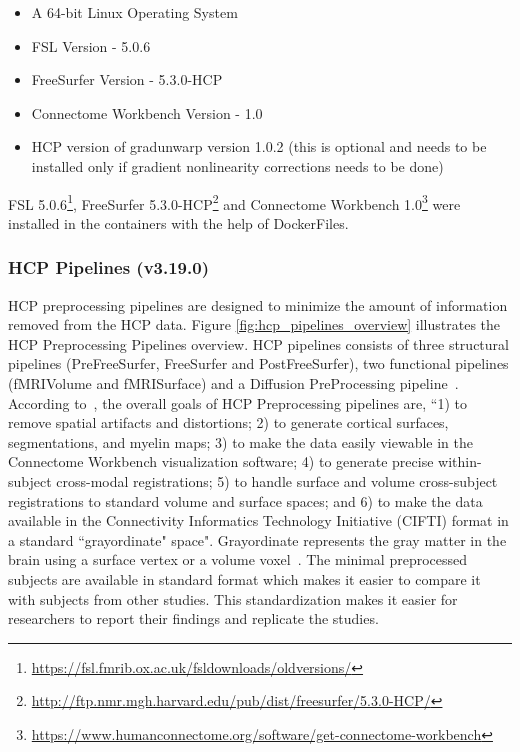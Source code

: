 \begin{itemize}
 \item A 64-bit Linux Operating System
 \item FSL Version - 5.0.6
 \item FreeSurfer Version - 5.3.0-HCP
 \item Connectome Workbench Version - 1.0
 \item HCP version of gradunwarp version 1.0.2 (this is optional and needs to be installed only if gradient nonlinearity corrections needs to be done)
\end{itemize}

FSL 5.0.6\footnote{\url{https://fsl.fmrib.ox.ac.uk/fsldownloads/oldversions/}}, FreeSurfer 5.3.0-HCP\footnote{\url{http://ftp.nmr.mgh.harvard.edu/pub/dist/freesurfer/5.3.0-HCP/}} and Connectome Workbench 1.0\footnote{\url{https://www.humanconnectome.org/software/get-connectome-workbench}} were installed in the containers with the help of DockerFiles.

\subsubsection{HCP Pipelines (v3.19.0)}
HCP preprocessing pipelines are designed to minimize the amount of information removed from the HCP data. Figure \ref{fig:hcp_pipelines_overview} illustrates the HCP Preprocessing Pipelines overview. HCP pipelines consists of three structural pipelines (PreFreeSurfer, FreeSurfer and PostFreeSurfer), two functional pipelines (fMRIVolume and fMRISurface) and a Diffusion PreProcessing pipeline~\cite{Gla13}. According to~\cite{Gla13}, the overall goals of HCP Preprocessing pipelines are, ``1) to remove spatial artifacts and distortions; 2) to generate cortical surfaces, segmentations, and myelin maps; 3) to make the data easily viewable in the Connectome Workbench visualization software; 4) to generate precise within-subject cross-modal registrations; 5) to handle surface and volume cross-subject registrations to standard volume and surface spaces; and 6) to make the data available in the Connectivity Informatics Technology Initiative (CIFTI) format in a standard ``grayordinate" space". Grayordinate represents the gray matter in the brain using a surface vertex or a volume voxel~\cite{Grayordinate}. The minimal preprocessed subjects are available in standard format which makes it easier to compare it with subjects from other studies. This standardization makes it easier for researchers to report their findings and replicate the studies.

